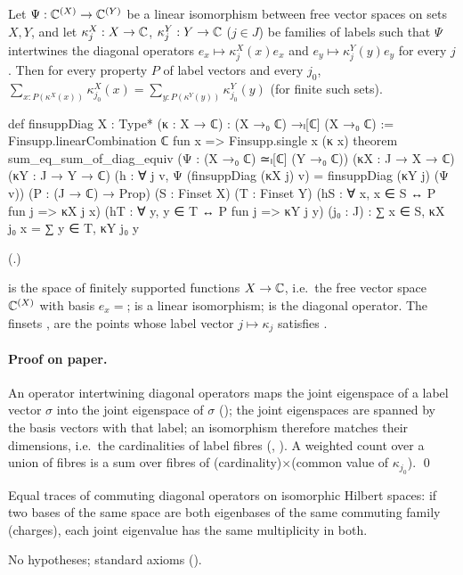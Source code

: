 \begin{theorem}\label{ch19:thm:transfer}
Let $\Psi:{\mathbb{C}}^{(X)}\to{\mathbb{C}}^{(Y)}$ be a linear isomorphism between free vector spaces on sets $X,Y$, and let $\kappa^X_j:X\to{\mathbb{C}}$,
$\kappa^Y_j:Y\to{\mathbb{C}}$ ($j\in J$) be families of labels such that $\Psi$ intertwines the diagonal operators
$e_x\mapsto\kappa^X_j(x)e_x$ and $e_y\mapsto\kappa^Y_j(y)e_y$ for every $j$.  Then for every property $P$ of label vectors and
every $j_0$, $\sum_{x:P(\kappa^X(x))}\kappa^X_{j_0}(x)=\sum_{y:P(\kappa^Y(y))}\kappa^Y_{j_0}(y)$ (for finite such sets).
\end{theorem}
\begin{leancode}
def finsuppDiag {X : Type*} (κ : X → ℂ) : (X →₀ ℂ) →ₗ[ℂ] (X →₀ ℂ) :=
  Finsupp.linearCombination ℂ fun x => Finsupp.single x (κ x)
theorem sum_eq_sum_of_diag_equiv (Ψ : (X →₀ ℂ) ≃ₗ[ℂ] (Y →₀ ℂ))
    (κX : J → X → ℂ) (κY : J → Y → ℂ)
    (h : ∀ j v, Ψ (finsuppDiag (κX j) v) = finsuppDiag (κY j) (Ψ v))
    (P : (J → ℂ) → Prop) (S : Finset X) (T : Finset Y)
    (hS : ∀ x, x ∈ S ↔ P fun j => κX j x) (hT : ∀ y, y ∈ T ↔ P fun j => κY j y) (j₀ : J) :
    ∑ x ∈ S, κX j₀ x = ∑ y ∈ T, κY j₀ y
\end{leancode}
(.)
\begin{dictionary}
 is the space of finitely supported functions $X\to{\mathbb{C}}$, i.e.\ the free vector space ${\mathbb{C}}^{(X)}$ with basis
$e_x=$;  is a linear isomorphism;  is the diagonal operator.  The
finsets ,  are the points whose label vector $j\mapsto\kappa_j$ satisfies .
\end{dictionary}
\paragraph{Proof on paper.}  An operator intertwining diagonal operators maps the joint eigenspace of a label vector
$\sigma$ into the joint eigenspace of $\sigma$ (); the joint eigenspaces are spanned by the
basis vectors with that label; an isomorphism therefore matches their dimensions, i.e.\ the cardinalities of label fibres
(, ).  A weighted count over a union of fibres is a
sum over fibres of (cardinality)$\times$(common value of $\kappa_{j_0}$). \qed
\begin{physics}Equal traces of commuting diagonal operators on isomorphic Hilbert spaces: if two bases of the same space are
both eigenbases of the same commuting family (charges), each joint eigenvalue has the same multiplicity in both.\end{physics}
\begin{status}No hypotheses; standard axioms ().\end{status}

